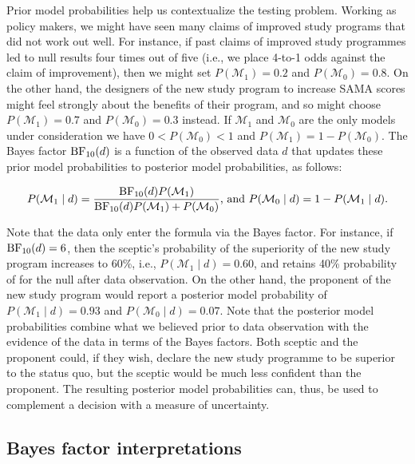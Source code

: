 \documentclass[english,,doc,floatsintext]{apa6}
\begin{document}
Prior model probabilities help us contextualize the testing problem. Working as policy makers, we might have seen many claims of improved study programs that did not work out well. For instance, if past claims of improved study programmes led to null results four times out of five (i.e., we place 4-to-1 odds against the claim of improvement), then we might set \(P( \mathcal{M}_{1}) = 0.2\) and \(P(\mathcal{M}_{0}) = 0.8\). On the other hand, the designers of the new study program to increase SAMA scores might feel strongly about the benefits of their program, and so might choose \(P( \mathcal{M}_{1}) = 0.7\) and \(P(\mathcal{M}_{0}) = 0.3\) instead. If \(\mathcal{M}_{1}\) and \(\mathcal{M}_{0}\) are the only models under consideration we have \(0 < P( \mathcal{M}_{0}) < 1\) and \(P( \mathcal{M}_{1})= 1 - P( \mathcal{M}_{0})\). The Bayes factor \(\textnormal{BF}_{10}(d)\) is a function of the observed data \(d\) that updates these prior model probabilities to posterior model probabilities, as follows:

\begin{align}
\label{eqPriorToPosterior}
P(\mathcal{M}_{1} \mid d) = \frac{ \textnormal{BF}_{10}(d) P(\mathcal{M}_{1})}{\textnormal{BF}_{10}(d) P(\mathcal{M}_{1}) + P(\mathcal{M}_{0})} \text{, and } P(\mathcal{M}_{0} \mid d) = 1 - P(\mathcal{M}_{1} \mid d). 
\end{align}

Note that the data only enter the formula via the Bayes factor. For instance, if \(\textnormal{BF}_{10}(d) = 6\), then the sceptic's probability of the superiority of the new study program increases to 60\%, i.e., \(P(\mathcal{M}_{1} \mid d)=0.60\), and retains 40\% probability of for the null after data observation. On the other hand, the proponent of the new study program would report a posterior model probability of \(P(\mathcal{M}_{1} \mid d)=0.93\) and \(P(\mathcal{M}_{0} \mid d)=0.07\). Note that the posterior model probabilities combine what we believed prior to data observation with the evidence of the data in terms of the Bayes factors. Both sceptic and the proponent could, if they wish, declare the new study programme to be superior to the status quo, but the sceptic would be much less confident than the proponent. The resulting posterior model probabilities can, thus, be used to complement a decision with a measure of uncertainty.

\hypertarget{bayes-factor-interpretations}{%
\subsection{Bayes factor interpretations}\label{bayes-factor-interpretations}}
\end{document}
